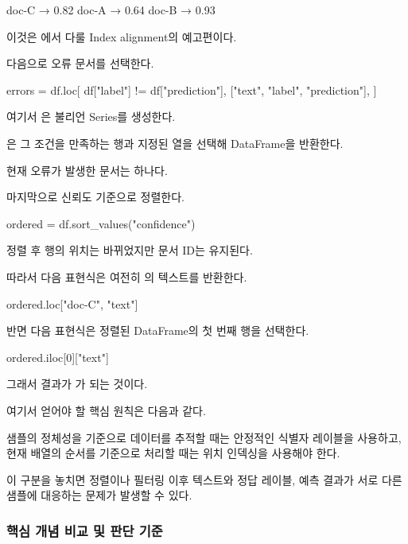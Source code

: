 \begin{dhkzsh}
doc-C → 0.82
doc-A → 0.64
doc-B → 0.93
\end{dhkzsh}

이것은 에서 다룰 Index alignment의 예고편이다.

다음으로 오류 문서를 선택한다.

\begin{dhkcode}
errors = df.loc[
    df["label"] != df["prediction"],
    ["text", "label", "prediction"],
]
\end{dhkcode}

여기서 은 불리언 Series를 생성한다.

은 그 조건을 만족하는 행과 지정된 열을 선택해 DataFrame을 반환한다.

현재 오류가 발생한 문서는  하나다.

마지막으로 신뢰도 기준으로 정렬한다.

\begin{dhkcode}
ordered = df.sort_values("confidence")
\end{dhkcode}

정렬 후 행의 위치는 바뀌었지만 문서 ID는 유지된다.

따라서 다음 표현식은 여전히 의 텍스트를 반환한다.

\begin{dhkcode}
ordered.loc["doc-C", "text"]
\end{dhkcode}

반면 다음 표현식은 정렬된 DataFrame의 첫 번째 행을 선택한다.

\begin{dhkcode}
ordered.iloc[0]["text"]
\end{dhkcode}

그래서 결과가 가 되는 것이다.

여기서 얻어야 할 핵심 원칙은 다음과 같다.

샘플의 정체성을 기준으로 데이터를 추적할 때는 안정적인 식별자 레이블을 사용하고, 현재 배열의 순서를 기준으로 처리할 때는 위치 인덱싱을 사용해야 한다.

이 구분을 놓치면 정렬이나 필터링 이후 텍스트와 정답 레이블, 예측 결과가 서로 다른 샘플에 대응하는 문제가 발생할 수 있다.

\subsubsection{핵심 개념 비교 및 판단 기준}

